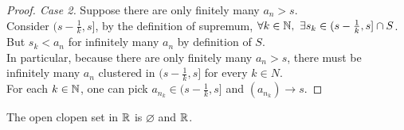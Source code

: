 \documentclass[11pt]{article}
\begin{document}
 	\begin{proof}[Proof. Case 2]
 		Suppose there are only finitely many $a_n > s$. \\
 		Consider $(s - \frac{1}{k}, s]$, by the definition of supremum, $\forall k \in \mathbb{N},\ \exists s_k \in (s - \frac{1}{k}, s] \cap S$. \\
 		But $s_k < a_n$ for infinitely many $a_n$ by definition of $S$. \\
 		In particular, because there are only finitely many $a_n > s$, there must be infinitely many $a_n$ clustered in $(s - \frac{1}{k}, s]$ for every $k \in N$.\\
 		For each $k \in \mathbb{N}$, one can pick $a_{n_k} \in (s - \frac{1}{k}, s]$ and $(a_{n_k}) \to s$.
 	\end{proof}
 	
 	\begin{proposition}
 		The open clopen set in $\mathbb{R}$ is $\varnothing$ and $\mathbb{R}$.
 	\end{proposition}
 	
\end{document}

